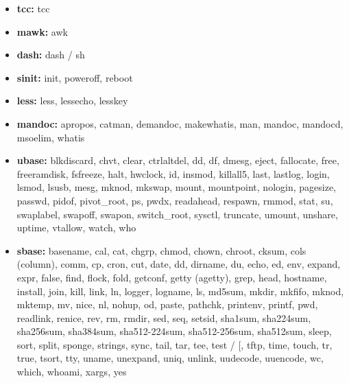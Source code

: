 \begin{itemize}
    \item \textbf{tcc:} tcc
    \item \textbf{mawk:} awk
    \item \textbf{dash:} dash / sh 
    \item \textbf{sinit:} init, poweroff, reboot
    \item \textbf{less:} less, lessecho, lesskey
    \item \textbf{mandoc:} apropos, catman, demandoc, makewhatis, man, mandoc, mandocd, msoelim, whatis
    \item \textbf{ubase:} blkdiscard, chvt, clear, ctrlaltdel, dd, df, dmesg, eject, fallocate, free, freeramdisk, fsfreeze, halt, hwclock, id, insmod, killall5, last, lastlog, login, lsmod, lsusb, mesg, mknod, mkswap, mount, mountpoint, nologin, pagesize, passwd, pidof, pivot\_root, ps, pwdx, readahead, respawn, rmmod, stat, su, swaplabel, swapoff, swapon, switch\_root, sysctl, truncate, umount, unshare, uptime, vtallow, watch, who
    \item \textbf{sbase:} basename, cal, cat, chgrp, chmod, chown, chroot, cksum, cols (column), comm, cp, cron, cut, date, dd, dirname, du, echo, ed, env, expand, expr, false, find, flock, fold, getconf, getty (agetty), grep, head, hostname, install, join, kill, link, ln, logger, logname, ls, md5sum, mkdir, mkfifo, mknod, mktemp, mv, nice, nl, nohup, od, paste, pathchk, printenv, printf, pwd, readlink, renice, rev, rm, rmdir, sed, seq, setsid, sha1sum, sha224sum, sha256sum, sha384sum, sha512-224sum, sha512-256sum, sha512sum, sleep, sort, split, sponge, strings, sync, tail, tar, tee, test / [, tftp, time, touch, tr, true, tsort, tty, uname, unexpand, uniq, unlink, uudecode, uuencode, wc, which, whoami, xargs, yes
\end{itemize}
